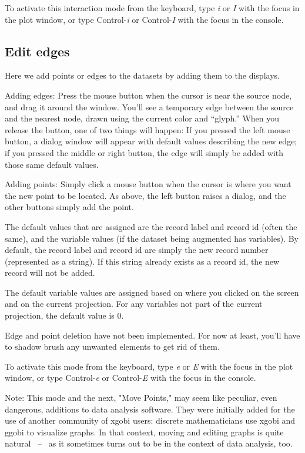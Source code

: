 \documentclass[11pt]{article}
\begin{document}
To activate this interaction mode from the keyboard, type {\em i} or {\em I}
with the focus in the plot window, or type Control-{\em i} or
Control-{\em I} with the focus in the console.

\subsection{Edit edges}
\label{slbl:EditEdges}

Here we add points or edges to the datasets by adding them to
the displays.  

Adding edges:  Press the mouse button when the cursor is near the
source node, and drag it around the window.  You'll see a temporary
edge between the source and the nearest node, drawn using the current
color and ``glyph.''  When you release the button, one of two things
will happen:  If you pressed the left mouse button, a dialog window
will appear with default values describing the new edge; if you
pressed the middle or right button, the edge will simply be added
with those same default values.

Adding points:  Simply click a mouse button when the cursor is
where you want the new point to be located.  As above, the left
button raises a dialog, and the other buttons simply add the point.

The default values that are assigned are the record label and record
id (often the same), and the variable values (if the dataset being
augmented has variables).  By default, the record label and record id
are simply the new record number (represented as a string).  If this
string already exists as a record id, the new record will not be added.

The default variable values are assigned based on where you clicked
on the screen and on the current projection.  For any variables not
part of the current projection, the default value is 0.

Edge and point deletion have not been implemented.  For now at
least, you'll have to shadow brush any unwanted elements to get
rid of them.

To activate this mode from the keyboard, type {\em e} or {\em E}
with the focus in the plot window, or type Control-{\em e} or
Control-{\em E} with the focus in the console.

Note: This mode and the next, "Move Points," may seem like peculiar,
even dangerous, additions to data analysis software.  They were
initially added for the use of another community of xgobi users:
discrete mathematicians use xgobi and ggobi to visualize graphs.  In
that context, moving and editing graphs is quite natural ~--~ as it
sometimes turns out to be in the context of data analysis, too.
\end{document}
